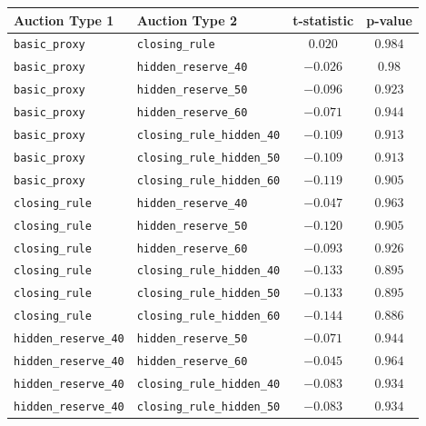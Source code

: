 \documentclass{article} %
\begin{document}
    \begin{table}
        \begin{tabular}{l l c c}
            \toprule
            Auction Type 1 & Auction Type 2 & t-statistic & p-value \\
            \midrule
            \texttt{basic\_proxy} & \texttt{closing\_rule} & \(0.020\) & \(0.984\) \\
            \texttt{basic\_proxy} & \texttt{hidden\_reserve\_40} & \(-0.026\) & \(0.98\) \\
            \texttt{basic\_proxy} & \texttt{hidden\_reserve\_50} & \(-0.096\) & \(0.923\) \\
            \texttt{basic\_proxy} & \texttt{hidden\_reserve\_60} & \(-0.071\) & \(0.944\) \\
            \texttt{basic\_proxy} & \texttt{closing\_rule\_hidden\_40} & \(-0.109\) & \(0.913\) \\
            \texttt{basic\_proxy} & \texttt{closing\_rule\_hidden\_50} & \(-0.109\) & \(0.913\) \\
            \texttt{basic\_proxy} & \texttt{closing\_rule\_hidden\_60} & \(-0.119\) & \(0.905\) \\
            \texttt{closing\_rule} & \texttt{hidden\_reserve\_40} & \(-0.047\) & \(0.963\) \\
            \texttt{closing\_rule} & \texttt{hidden\_reserve\_50} & \(-0.120\) & \(0.905\) \\
            \texttt{closing\_rule} & \texttt{hidden\_reserve\_60} & \(-0.093\) & \(0.926\) \\
            \texttt{closing\_rule} & \texttt{closing\_rule\_hidden\_40} & \(-0.133\) & \(0.895\) \\
            \texttt{closing\_rule} & \texttt{closing\_rule\_hidden\_50} & \(-0.133\) & \(0.895\) \\
            \texttt{closing\_rule} & \texttt{closing\_rule\_hidden\_60} & \(-0.144\) & \(0.886\) \\
            \texttt{hidden\_reserve\_40} & \texttt{hidden\_reserve\_50} & \(-0.071\) & \(0.944\) \\
            \texttt{hidden\_reserve\_40} & \texttt{hidden\_reserve\_60} & \(-0.045\) & \(0.964\) \\
            \texttt{hidden\_reserve\_40} & \texttt{closing\_rule\_hidden\_40} & \(-0.083\) & \(0.934\) \\
            \texttt{hidden\_reserve\_40} & \texttt{closing\_rule\_hidden\_50} & \(-0.083\) & \(0.934\) \\

\end{tabular}
\end{table}
\end{document}
